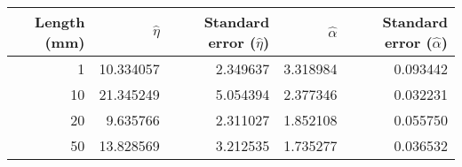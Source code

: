 \begin{tabular}{rrrrr}
\toprule
 Length (mm) &  $\hat{\eta}$ &  Standard error ($\hat{\eta}$) &  $\hat{\alpha}$ &  Standard error ($\hat{\alpha}$) \\
\midrule
           1 &     10.334057 &                       2.349637 &        3.318984 &                         0.093442 \\
          10 &     21.345249 &                       5.054394 &        2.377346 &                         0.032231 \\
          20 &      9.635766 &                       2.311027 &        1.852108 &                         0.055750 \\
          50 &     13.828569 &                       3.212535 &        1.735277 &                         0.036532 \\
\bottomrule
\end{tabular}
